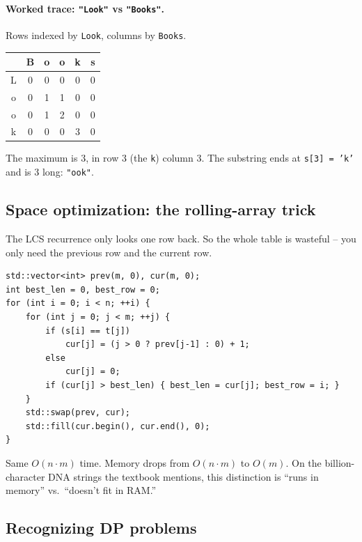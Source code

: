 \documentclass[11pt]{article}
\begin{document}
\paragraph{Worked trace: \texttt{"Look"} vs \texttt{"Books"}.}
Rows indexed by \texttt{Look}, columns by \texttt{Books}.

\begin{center}
\small
\begin{tabular}{c|ccccc}
 & B & o & o & k & s \\
\hline
L & 0 & 0 & 0 & 0 & 0 \\
o & 0 & 1 & 1 & 0 & 0 \\
o & 0 & 1 & 2 & 0 & 0 \\
k & 0 & 0 & 0 & 3 & 0 \\
\end{tabular}
\normalsize
\end{center}

The maximum is 3, in row 3 (the \texttt{k}) column 3. The substring
ends at \texttt{s[3] = 'k'} and is 3 long: \texttt{"ook"}.

\subsection{Space optimization: the rolling-array trick}

The LCS recurrence only looks one row back. So the whole table is
wasteful -- you only need the previous row and the current row.

\begin{examplebox}
\begin{verbatim}
std::vector<int> prev(m, 0), cur(m, 0);
int best_len = 0, best_row = 0;
for (int i = 0; i < n; ++i) {
    for (int j = 0; j < m; ++j) {
        if (s[i] == t[j])
            cur[j] = (j > 0 ? prev[j-1] : 0) + 1;
        else
            cur[j] = 0;
        if (cur[j] > best_len) { best_len = cur[j]; best_row = i; }
    }
    std::swap(prev, cur);
    std::fill(cur.begin(), cur.end(), 0);
}
\end{verbatim}
Same $O(n \cdot m)$ time. Memory drops from $O(n \cdot m)$ to
$O(m)$. On the billion-character DNA strings the textbook mentions,
this distinction is ``runs in memory'' vs.\ ``doesn't fit in RAM.''
\end{examplebox}

\subsection{Recognizing DP problems}
\end{document}
